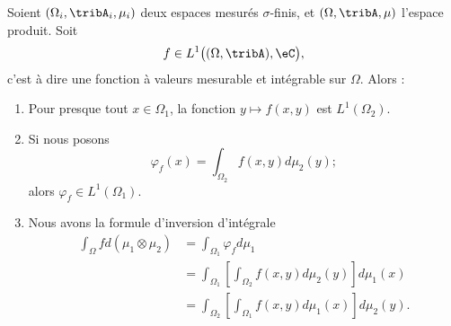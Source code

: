 \begin{theorem}\label{ThoFubinioYLtPI}
    Soient \( (\Omega_i,\tribA_i,\mu_i)\) deux espaces mesurés \( \sigma\)-finis, et \( (\Omega,\tribA,\mu)\) l'espace produit. Soit
    \begin{equation}
        f\in L^1\big( (\Omega,\tribA),\eC \big),
    \end{equation}
    c'est à dire une fonction à valeurs mesurable et intégrable sur \( \Omega\). Alors :
    \begin{enumerate}
        \item       \label{ITEMooVFGWooZTePQS}
            Pour presque tout \( x\in \Omega_1\), la fonction \( y\mapsto f(x,y)\) est \( L^1(\Omega_2)\).
        \item       \label{ITEMooCYMKooUdizni}
            Si nous posons
            \begin{equation}
                \varphi_f(x)=\int_{\Omega_2}f(x,y)d\mu_2(y);
            \end{equation}
            alors \( \varphi_f\in L^1(\Omega_1)\).
        \item   \label{ItemQMWiolgiii}
            Nous avons la formule d'inversion d'intégrale
            \begin{subequations}
                \begin{align}
                \int_{\Omega}fd(\mu_1\otimes \mu_2)&=\int_{\Omega_1}\varphi_fd\mu_1\\
                &=\int_{\Omega_1}\left[ \int_{\Omega_2}f(x,y)d\mu_2(y) \right]d\mu_1(x)\\
                &=\int_{\Omega_2}\left[ \int_{\Omega_1}f(x,y)d\mu_1(x) \right]d\mu_2(y).
                \end{align}
            \end{subequations}
    \end{enumerate}

\end{theorem}

